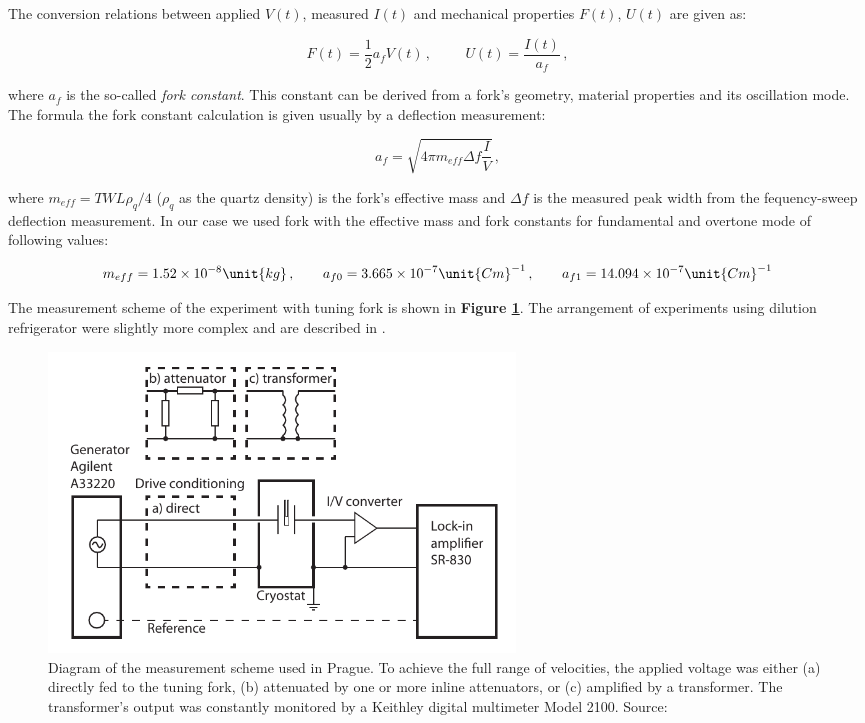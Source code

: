 The conversion relations between applied $V(t)$, measured $I(t)$ and mechanical properties $F(t)$, $U(t)$ are given \cite{forks} as:

\begin{equation}
F(t) = \frac{1}{2} a_{f} V(t)\,,
\hspace{1cm}
U(t) = \frac{I(t)}{a_{f}}\,,
\label{fork_conversions}
\end{equation}

where $a_{f}$ is the so-called \textit{fork constant}. This constant can be derived from a fork's geometry, material properties and its oscillation mode. The formula the fork constant calculation is given usually by a deflection measurement:

\begin{equation}
a_{f} = \sqrt{4\pi m_{eff} \Delta f \frac{I}{V}}\,,
\end{equation}

where $m_{eff} = TWL\rho_q /4$ ($\rho_q$ as the quartz density) is the fork's effective mass and $\Delta f$ is the measured peak width from the fequency-sweep deflection measurement. In our case we used fork with the effective mass and fork constants for fundamental and overtone mode of following values:

\begin{equation}
m_{eff} = 1.52 \times 10^{-8} \unit{kg}\,,
\hspace{7mm}
a_{f0} = 3.665 \times 10^{-7} \unit{Cm}^{-1}\,,
\hspace{7mm}
a_{f1} = 14.094 \times 10^{-7} \unit{Cm}^{-1}
\end{equation}

The measurement scheme of the experiment with tuning fork is shown in \textbf{Figure \ref{setup}}. The arrangement of experiments using dilution refrigerator were slightly more complex and are described in \cite{skyba} .

\begin{figure}[h]
	\centering
	\includegraphics[width=0.6\textwidth]{graphics/exp/fork_setup}
	\caption{Diagram of the measurement scheme used in Prague. To achieve the full range of velocities, the applied voltage was either (a) directly fed to the tuning fork, (b) attenuated by one or more inline attenuators, or (c) amplified by a transformer. The transformer’s output was constantly monitored by a Keithley digital multimeter Model 2100. Source: \cite{multiple-vels}}
	\label{setup}
\end{figure}

